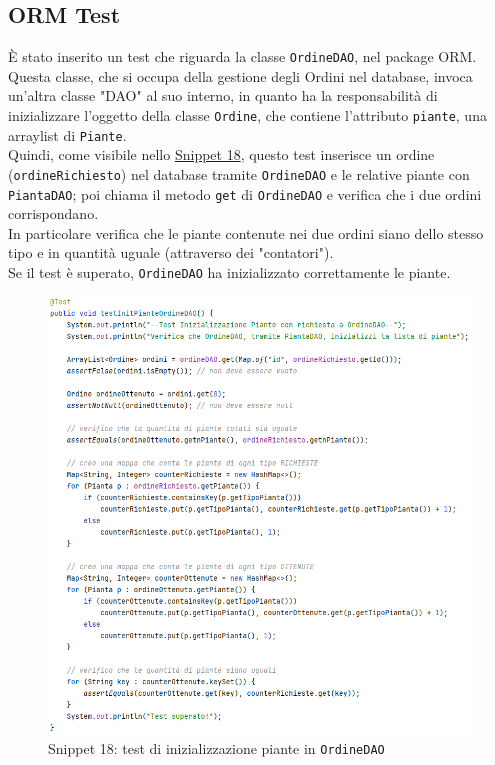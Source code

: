 \documentclass{article}
\newcommand{\code}[1]{\texttt{#1}}
\begin{document}
\subsection{ORM Test}
È stato inserito un test che riguarda la classe \code{OrdineDAO}, nel package ORM.\\
Questa classe, che si occupa della gestione degli Ordini nel database, invoca un'altra classe "DAO" al suo interno, in quanto ha la responsabilità di inizializzare l'oggetto della classe \code{Ordine}, che contiene l'attributo \code{piante}, una arraylist di \code{Piante}. \\
Quindi, come visibile nello \hyperref[fig:snippet_testInitPianteOrdineDAO]{Snippet 18}, questo test inserisce un ordine (\code{ordineRichiesto}) nel database tramite \code{OrdineDAO} e le relative piante con \code{PiantaDAO}; poi chiama il metodo \code{get} di \code{OrdineDAO} e verifica che i due ordini corrispondano.\\
In particolare verifica che le piante contenute nei due ordini siano dello stesso tipo e in quantità uguale (attraverso dei "contatori").\\
Se il test è superato, \code{OrdineDAO} ha inizializzato correttamente le piante.

\begin{figure}[H]
    \centering
    \includegraphics[scale=0.5]{resources/images/Snippets/snippet_testInitPianteOrdineDAO.png}
    \captionsetup{labelformat=empty,labelsep=none}
    \caption{Snippet 18: test di inizializzazione piante in \code{OrdineDAO}}
    \label{fig:snippet_testInitPianteOrdineDAO}
\end{figure}
\end{document}
